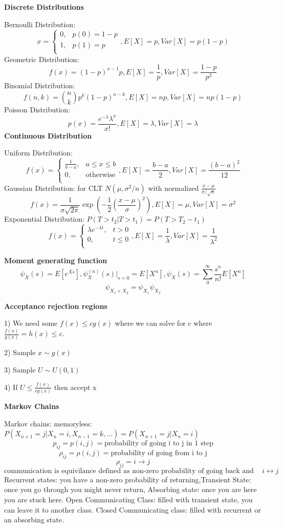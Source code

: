 \documentclass[8pt]{extarticle}
\begin{document}
\textbf{Discrete Distributions}

Bernoulli Distribution: $$x = \begin{cases}
0,&p(0) = 1-p\\
1,& p(1) = p\\
\end{cases}, E[X] = p, Var[X] = p(1-p)
$$
Geometric Distribution:
$$f(x) = (1-p)^{x-1}p, E[X] = \frac1p, Var[X] = \frac{1-p}{p^2}$$
Binomial Distribution:
$$f(n,k) = \binom nk p^k(1-p)^{n-k}, E[X] = np, Var[X] = np(1-p)$$
Poisson Distribution:
$$p(x) = \frac{e^{-\lambda}\lambda^x}{x!}, E[X] = \lambda, Var[X] = \lambda$$
\textbf{Continuous Distribution}

Uniform Distribution:
$$f(x) = \begin{cases}
\frac1 {b-a},& a \leq x \leq b\\
0,& \text{otherwise}\\
\end{cases}, E[X] = \frac{b-a}2,Var[X] = \frac{(b-a)^2}{12}$$
Gaussian Distribution: for CLT $N(\mu,\sigma^2/n)$ with normalized $\frac{x-\mu}{\sigma/\sqrt n}$
$$f(x) = \frac{1}{\sigma \sqrt{2\pi}}\exp\left(-\frac12 \left(\frac{x-\mu}{\sigma}\right)^2\right), E[X] = \mu, Var[X] = \sigma^2$$
Exponential Distribution: $P(T>t_2|T>t_1) = P(T>T_2-t_1)$
$$f(x) = \begin{cases}
\lambda e^{-\lambda t}, & t>0\\
0, & t\leq 0\\\end{cases}, E[X] = \frac1\lambda, Var[X] = \frac1 {\lambda^2}$$

\textbf{Moment generating function}
$$\psi_X(s) = E[e^{Xs}], \psi^{(n)}_X(s)|_{s=0} = E[X^n], \psi_X(s) = \sum_0^\infty \frac{s^n}{n!}E[X^n]$$
$$\psi_{X_1+X_2} = \psi_{X_1}\psi_{X_2}$$

\textbf{Acceptance rejection regions}

1) We need some $f(x) \leq cg(x)$ where we can solve for c where $\frac{f(x)}{g(x)} = h(x) \leq c$.

2) Sample $x\sim g(x)$

3) Sample $U\sim U(0,1)$

4) If $U\leq \frac{f(x)}{cg(x)}$ then accept x

\textbf{Markov Chains}

Markov chains: memoryless: $P(X_{n+1} = j|X_{n} =i, X_{n-1} = k,...) = P(X_{n+1} = j|X_{n} = i)$
$$p_{ij} = p(i,j) = \text{probability of going i to j in 1 step}$$
$$\rho_{ij} = \rho (i,j) = \text{probability of going from i to j}$$
$$\rho_{ij} = i\rightarrow j$$
$$\text{communication is equivilance defined as non-zero probability of going back and forth } i\leftrightarrow j$$
Recurrent states: you have a non-zero probability of returning,Transient State: once you go through you might never return,
Absorbing state: once you are here you are stuck here.
Open Communicating Class: filled with transient state, you can leave it to another class. Closed Communicating class: filled with recurrent or an absorbing state.
\end{document}
